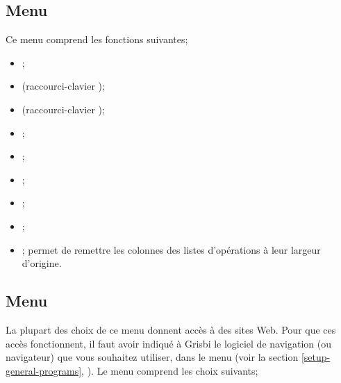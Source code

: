 \subsection{Menu \label{home-menus-display}}

Ce menu comprend les fonctions suivantes; 

\begin{itemize}
	 \item {}; 
	 \item {} (raccourci-clavier );
	 \item {} (raccourci-clavier );
	 \item {};
	 \item {};
	 \item {};
	 \item {};
	 \item {};
	 \item {}; permet de remettre les colonnes des listes d'opérations à leur largeur d'origine.
\end{itemize}


\subsection{Menu \label{home-menus-help}}

La plupart des choix de ce menu donnent accès à des sites Web. Pour que ces accès fonctionnent, il faut avoir indiqué à Grisbi le logiciel de navigation (ou navigateur) que vous souhaitez utiliser, dans le menu  (voir la section \vref{setup-general-programs}, ). Le menu  comprend les choix suivants;

